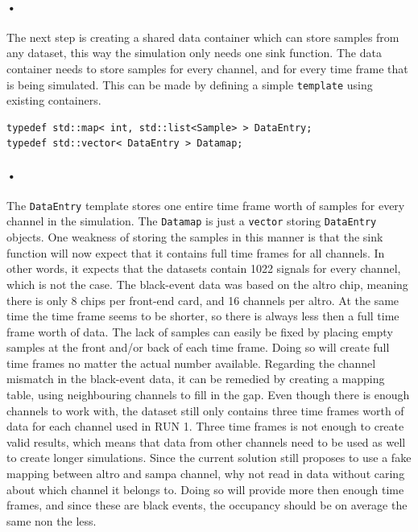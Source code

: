 \documentclass[a4paper, 12pt]{report}\dfrac{\right }{•}
\newcommand{\codeword}[1]{\texttt{#1}}
\begin{document}
\paragraph{•}
The next step is creating a shared data container which can store samples from any dataset, this way the simulation only needs one sink function.
The data container needs to store samples for every channel, and for every time frame that is being simulated.
This can be made by defining a simple \codeword{template} using existing containers.

\begin{lstlisting}[caption=Data container., label=lst:data-template]
typedef std::map< int, std::list<Sample> > DataEntry;
typedef std::vector< DataEntry > Datamap;
\end{lstlisting}

\paragraph{•}
The \codeword{DataEntry} template stores one entire time frame worth of samples for every channel in the simulation.
The \codeword{Datamap} is just a \codeword{vector} storing \codeword{DataEntry} objects.
One weakness of storing the samples in this manner is that the sink function will now expect that it contains full time frames for all channels.
In other words, it expects that the datasets contain 1022 signals for every channel, which is not the case.
The black-event data was based on the \gls{altro} chip, meaning there is only 8 chips per front-end card, and 16 channels per \gls{altro}.
At the same time the time frame seems to be shorter, so there is always less then a full time frame worth of data.
The lack of samples can easily be fixed by placing empty samples at the front and/or back of each time frame.
Doing so will create full time frames no matter the actual number available.
Regarding the channel mismatch in the black-event data, it can be remedied by creating a mapping table, using neighbouring channels to fill in the gap.
Even though there is enough channels to work with, the dataset still only contains three time frames worth of data for each channel used in RUN 1.
Three time frames is not enough to create valid results, which means that data from other channels need to be used as well to create longer simulations.
Since the current solution still proposes to use a fake mapping between \gls{altro} and \gls{sampa} channel, why not read in data without caring about which channel it belongs to.
Doing so will provide more then enough time frames, and since these are black events, the occupancy should be on average the same non the less.
\end{document}
